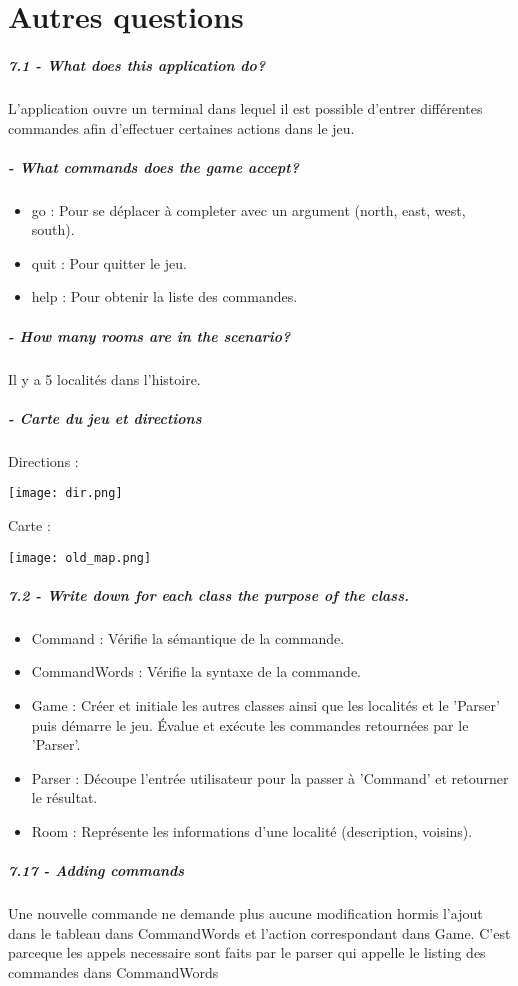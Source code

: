 \documentclass[11pt,a4paper]{report}
\begin{document}
\chapter{Autres questions}
\paragraph{7.1 - What does this application do?}
L'application ouvre un terminal dans lequel il est possible d'entrer différentes commandes afin d'effectuer certaines actions dans le jeu.
\paragraph{    - What commands does the game accept?}
\begin{itemize}
\item go	:	Pour se déplacer à completer avec un argument (north, east, west, south).
\item quit	:	Pour quitter le jeu.
\item help	:	Pour obtenir la liste des commandes.
\end{itemize}
\paragraph{    - How many rooms are in the scenario?}
Il y a 5 localités dans l'histoire.
\paragraph{    - Carte du jeu et directions}
Directions :\\
\centerline{\texttt{[image: dir.png]}}
Carte :\\
\centerline{\texttt{[image: old\_map.png]}}
\paragraph{7.2 - Write down for each class the purpose of the class.}
\begin{itemize}
\item Command				:		Vérifie la sémantique de la commande.
\item CommandWords		:		Vérifie la syntaxe de la commande.
\item Game				:		Créer et initiale les autres classes ainsi que les localités et le 'Parser' puis démarre le jeu. Évalue et exécute les commandes retournées par le 'Parser'.
\item Parser				:		Découpe l'entrée utilisateur pour la passer à 'Command' et retourner le résultat.
\item Room				:		Représente les informations d'une localité (description, voisins).

\end{itemize}
\paragraph{7.17 - Adding commands}
Une nouvelle commande ne demande plus aucune modification hormis l'ajout dans le tableau dans CommandWords et l'action correspondant dans Game. C'est parceque les appels necessaire sont faits par le parser qui appelle le listing des commandes dans CommandWords
\end{document}
